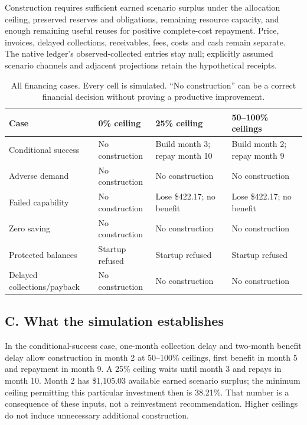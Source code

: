 \documentclass[11pt,letterpaper]{article}
\newcommand{\usd}[1]{\$#1}
\begin{document}
Construction requires sufficient earned scenario surplus under the allocation ceiling, preserved reserves and obligations, remaining resource capacity, and enough remaining useful reuses for positive complete-cost repayment. Price, invoices, delayed collections, receivables, fees, costs and cash remain separate. The native ledger's observed-collected entries stay null; explicitly assumed scenario channels and adjacent projections retain the hypothetical receipts.

\begin{table}[htbp]
\small
\caption{All financing cases. Every cell is simulated. ``No construction'' can be a correct financial decision without proving a productive improvement.}
\label{tab:finance}
\begin{tabularx}{\textwidth}{@{}P{.27\textwidth}YYY@{}}
\toprule Case & 0\% ceiling & 25\% ceiling & 50--100\% ceilings\\\midrule
Conditional success & No construction & Build month 3; repay month 10 & Build month 2; repay month 9\\[4pt]
Adverse demand & No construction & No construction & No construction\\[4pt]
Failed capability & No construction & Lose \usd{422.17}; no benefit & Lose \usd{422.17}; no benefit\\[4pt]
Zero saving & No construction & No construction & No construction\\[4pt]
Protected balances & Startup refused & Startup refused & Startup refused\\[4pt]
Delayed collections/payback & No construction & No construction & No construction\\\bottomrule
\end{tabularx}
\end{table}

\subsection{C. What the simulation establishes}

In the conditional-success case, one-month collection delay and two-month benefit delay allow construction in month 2 at 50--100\% ceilings, first benefit in month 5 and repayment in month 9. A 25\% ceiling waits until month 3 and repays in month 10. Month 2 has \usd{1,105.03} available earned scenario surplus; the minimum ceiling permitting this particular investment then is 38.21\%. That number is a consequence of these inputs, not a reinvestment recommendation. Higher ceilings do not induce unnecessary additional construction.
\end{document}
